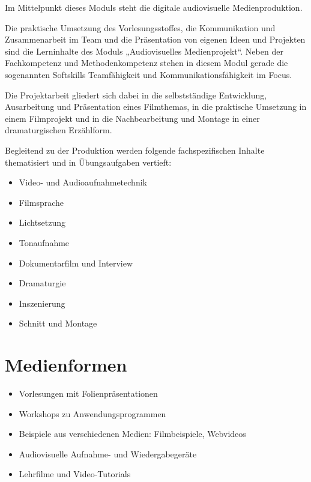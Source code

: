 Im Mittelpunkt dieses Moduls steht die digitale audiovisuelle
Medienproduktion.

Die praktische Umsetzung des Vorlesungsstoffes, die Kommunikation und
Zusammenarbeit im Team und die Präsentation von eigenen Ideen und
Projekten sind die Lerninhalte des Moduls „Audiovisuelles
Medienprojekt``. Neben der Fachkompetenz und Methodenkompetenz stehen in
diesem Modul gerade die sogenannten Softskills Teamfähigkeit und
Kommunikationsfähigkeit im Focus.

Die Projektarbeit gliedert sich dabei in die selbstständige Entwicklung,
Ausarbeitung und Präsentation eines Filmthemas, in die praktische
Umsetzung in einem Filmprojekt und in die Nachbearbeitung und Montage in
einer dramaturgischen Erzählform.

Begleitend zu der Produktion werden folgende fachspezifischen Inhalte
thematisiert und in Übungsaufgaben vertieft:

\begin{itemize}
\tightlist
\item
  Video- und Audioaufnahmetechnik
\item
  Filmsprache
\item
  Lichtsetzung
\item
  Tonaufnahme
\item
  Dokumentarfilm und Interview
\item
  Dramaturgie
\item
  Inszenierung
\item
  Schnitt und Montage
\end{itemize}

\hypertarget{medienformenpathlabelmi-2017modulbeschreibungen-bachelorba_avm}{%
\section*{Medienformen\label{/mi-2017/modulbeschreibungen-bachelor/BA_AVM}}\label{medienformenpathlabelmi-2017modulbeschreibungen-bachelorba_avm}}

\begin{itemize}
\tightlist
\item
  Vorlesungen mit Folienpräsentationen
\item
  Workshops zu Anwendungsprogrammen
\item
  Beispiele aus verschiedenen Medien: Filmbeispiele, Webvideos
\item
  Audiovisuelle Aufnahme- und Wiedergabegeräte
\item
  Lehrfilme und Video-Tutorials
\end{itemize}

